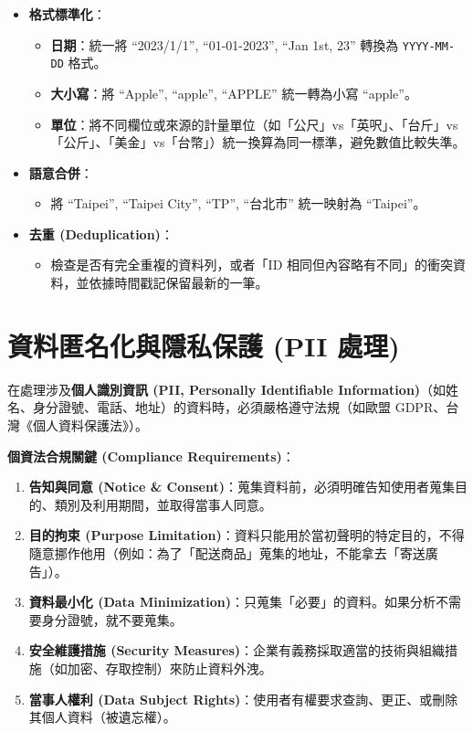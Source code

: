 \documentclass[
  letterpaper,
  DIV=11,
  numbers=noendperiod]{scrreprt}
\providecommand{\tightlist}{%
  \setlength{\itemsep}{0pt}\setlength{\parskip}{0pt}}
\begin{document}
\begin{itemize}
\tightlist
\item
  \textbf{格式標準化}：

  \begin{itemize}
  \tightlist
  \item
    \textbf{日期}：統一將 ``2023/1/1'', ``01-01-2023'', ``Jan 1st, 23''
    轉換為 \texttt{YYYY-MM-DD} 格式。
  \item
    \textbf{大小寫}：將 ``Apple'', ``apple'', ``APPLE'' 統一轉為小寫
    ``apple''。
  \item
    \textbf{單位}：將不同欄位或來源的計量單位（如「公尺」vs「英呎」、「台斤」vs「公斤」、「美金」vs「台幣」）統一換算為同一標準，避免數值比較失準。
  \end{itemize}
\item
  \textbf{語意合併}：

  \begin{itemize}
  \tightlist
  \item
    將 ``Taipei'', ``Taipei City'', ``TP'', ``台北市'' 統一映射為
    ``Taipei''。
  \end{itemize}
\item
  \textbf{去重 (Deduplication)}：

  \begin{itemize}
  \tightlist
  \item
    檢查是否有完全重複的資料列，或者「ID
    相同但內容略有不同」的衝突資料，並依據時間戳記保留最新的一筆。
  \end{itemize}
\end{itemize}

\section{資料匿名化與隱私保護 (PII 處理)}\label{sec-anonymization}

在處理涉及\textbf{個人識別資訊 (PII, Personally Identifiable
Information)}（如姓名、身分證號、電話、地址）的資料時，必須嚴格遵守法規（如歐盟
GDPR、台灣《個人資料保護法》）。

\textbf{個資法合規關鍵 (Compliance Requirements)}：

\begin{enumerate}
\def\labelenumi{\arabic{enumi}.}
\tightlist
\item
  \textbf{告知與同意 (Notice \&
  Consent)}：蒐集資料前，必須明確告知使用者蒐集目的、類別及利用期間，並取得當事人同意。
\item
  \textbf{目的拘束 (Purpose
  Limitation)}：資料只能用於當初聲明的特定目的，不得隨意挪作他用（例如：為了「配送商品」蒐集的地址，不能拿去「寄送廣告」）。
\item
  \textbf{資料最小化 (Data
  Minimization)}：只蒐集「必要」的資料。如果分析不需要身分證號，就不要蒐集。
\item
  \textbf{安全維護措施 (Security
  Measures)}：企業有義務採取適當的技術與組織措施（如加密、存取控制）來防止資料外洩。
\item
  \textbf{當事人權利 (Data Subject
  Rights)}：使用者有權要求查詢、更正、或刪除其個人資料（被遺忘權）。
\end{enumerate}
\end{document}

